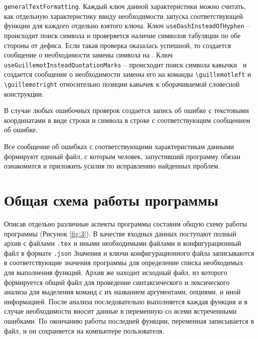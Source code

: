     \verb|generalTextFormatting|. Каждый ключ данной характеристики можно считать, как отдельную характеристику ввиду необходимости запуска соответствующей функции для каждого отдельно взятого ключа. Ключ \verb|useDashInsteadOfHyphen| -- происходит поиск символа \guillemotright и проверяется наличие символов табуляции по обе стороны от дефиса. Если такая проверка оказалась успешной, то создается сообщение о необходимости замены символа на \guillemotright. Ключ \verb|useGuillemotInsteadQuotationMarks| -- происходит поиск символа  кавычки\guillemotright\verb| | и создается сообщение о необходимости замены его на команды \verb|\guillemotleft| и  \verb|\guillemotright| относительно позиции кавычек к оборачиваемой словесной конструкции.
    
    В случае любых ошибочных проверок создается запись об ошибке с текстовыми координатами в виде строки и символа в строке с соответствующим сообщением об ошибке.

 Все сообщение об ошибках с соответствующими характеристикам данными формируют единый файл, с которым человек, запустивший программу обязан ознакомится и приложить усилия по исправлению найденных проблем.

\section{Общая схема работы программы}

    Описав отдельно различные аспекты программы составим общую схему работы программы (Рисунок \ref{fig:3}). В качестве входных данных поступают полный архив с файлами \verb|.tex| и иными необходимыми файлами и конфигурационный файл в формате \verb|.json| Значения и ключи  конфигурационного файла записываются в соответствующие значения программы для определение списка необходимых для выполнения функций. Архив же находит исходный файл, из которого формируется общий файл для проведение синтаксического и лексического анализа для выделения команд с их названием аргументами, опциями, и иной информацией. После анализа последовательно выполняется каждая функция и в случае необходимости вносит данные в переменную со всеми встреченными ошибками. По окончанию работы последней функции, переменная записывается в файл, и он сохраняется на компьютере пользователя.

